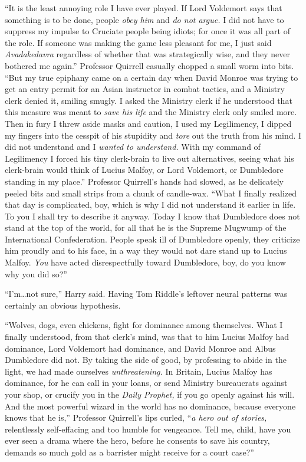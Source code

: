 “It is the least annoying role I have ever played. If Lord Voldemort says that
something is to be done, people \emph{obey him} and \emph{do not argue.} I did
not have to suppress my impulse to Cruciate people being idiots; for once it
was all part of the role. If someone was making the game less pleasant for me,
I just said \emph{Avadakedavra} regardless of whether that was strategically
wise, and they never bothered me again.” Professor Quirrell casually chopped a
small worm into bits. “But my true epiphany came on a certain day when David
Monroe was trying to get an entry permit for an Asian instructor in combat
tactics, and a Ministry clerk denied it, smiling smugly. I asked the Ministry
clerk if he understood that this measure was meant to \emph{save his life} and
the Ministry clerk only smiled more. Then in fury I threw aside masks and
caution, I used my Legilimency, I dipped my fingers into the cesspit of his
stupidity and \emph{tore} out the truth from his mind. I did not understand and
I \emph{wanted to understand.} With my command of Legilimency I forced his tiny
clerk-brain to live out alternatives, seeing what his clerk-brain would think
of Lucius Malfoy, or Lord Voldemort, or Dumbledore standing in my place.”
Professor Quirrell’s hands had slowed, as he delicately peeled bits and small
strips from a chunk of candle-wax. “What I finally realized that day is
complicated, boy, which is why I did not understand it earlier in life. To you
I shall try to describe it anyway. Today I know that Dumbledore does not stand
at the top of the world, for all that he is the Supreme Mugwump of the
International Confederation. People speak ill of Dumbledore openly, they
criticize him proudly and to his face, in a way they would not dare stand up to
Lucius Malfoy. \emph{You} have acted disrespectfully toward Dumbledore, boy, do
you know why you did so?”

“I’m…not sure,” Harry said. Having Tom Riddle’s leftover neural
patterns was certainly an obvious hypothesis.

“Wolves, dogs, even chickens, fight for dominance among themselves. What I
finally understood, from that clerk’s mind, was that to him Lucius Malfoy had
dominance, Lord Voldemort had dominance, and David Monroe and Albus Dumbledore
did not. By taking the side of good, by professing to abide in the light, we
had made ourselves \emph{unthreatening.} In Britain, Lucius Malfoy has
dominance, for he can call in your loans, or send Ministry bureaucrats against
your shop, or crucify you in the \emph{Daily Prophet,} if you go openly against
his will. And the most powerful wizard in the world has no dominance, because
everyone knows that he is,” Professor Quirrell’s lips curled, “\emph{a hero out
of stories,} relentlessly self-effacing and too humble for vengeance. Tell me,
child, have you ever seen a drama where the hero, before he consents to save
his country, demands so much gold as a barrister might receive for a court
case?”


